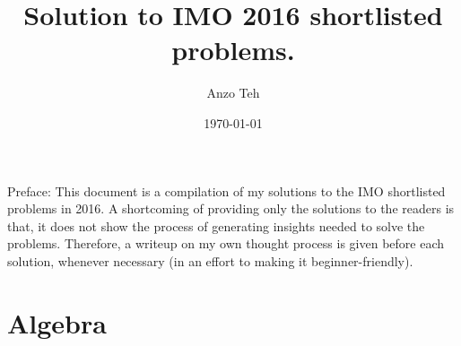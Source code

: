 \documentclass[11pt,a4paper]{article}
\begin{document}
\newcommand{\la}{\leftarrow}
\newcommand{\lra}{\leftrightarrow}


\title{Solution to IMO 2016 shortlisted problems.}
\author{Anzo Teh}
\date{\today}
\maketitle

Preface: 
This document is a compilation of my solutions to the IMO shortlisted problems in 2016. 
A shortcoming of providing only the solutions to the readers is that, it does not show the process of generating insights needed to solve the problems. 
Therefore, a writeup on my own thought process is given before each solution, whenever necessary (in an effort to making it beginner-friendly). 

\section{Algebra}
\end{document}
